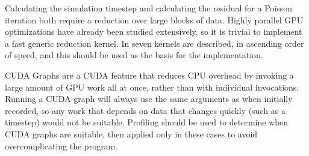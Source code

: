 
Calculating the simulation timestep and calculating the residual for a Poisson iteration both require a reduction over large blocks of data.
Highly parallel GPU optimizations have already been studied extensively, so it is trivial to implement a fast generic reduction kernel.
In \cite{CUDAParallelReduction} seven kernels are described, in ascending order of speed, and this should be used as the basis for the implementation.

CUDA Graphs are a CUDA feature that reduces CPU overhead by invoking a large amount of GPU work all at once, rather than with individual invocations.
Running a CUDA graph will always use the same arguments as when initially recorded, so any work that depends on data that changes quickly (such as a timestep) would not be suitable.
Profiling should be used to determine when CUDA graphs are suitable, then applied only in these cases to avoid overcomplicating the program.